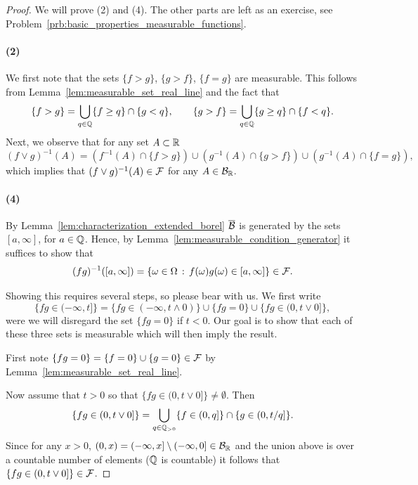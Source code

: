 \begin{proof}
We will prove (2) and (4). The other parts are left as an exercise, see Problem~\ref{prb:basic_properties_measurable_functions}.

\paragraph{(2)} We first note that the sets $\{f > g\}$, $\{g > f\}$, $\{f=g\}$ are measurable. This follows from Lemma~\ref{lem:measurable_set_real_line} and the fact that
\[
	\{f > g\} = \bigcup_{q \in \mathbb Q} \{f \ge q\} \cap \{g < q\},\qquad \{g > f\} = \bigcup_{q \in \mathbb Q} \{g \ge q\} \cap \{f < q\}.
\]
Next, we observe that for any set $A \subset \mathbb R$
\[
	(f \vee g)^{-1}(A) = \left(f^{-1}(A) \cap \{f > g\}\right) \cup \left(g^{-1}(A) \cap \{g > f\}\right) \cup (g^{-1}(A) \cap \{f=g\}),
\]
which implies that $(f \vee g)^{-1}(A) \in \mathcal F$ for any $A \in \mathcal B_{\mathbb R}$.

\paragraph{(4)} By Lemma~\ref{lem:characterization_extended_borel} $\overline{\mathcal B}$ is generated by the sets $[a,\infty]$, for $a \in \mathbb Q$. Hence, by Lemma~\ref{lem:measurable_condition_generator} it suffices to show that 
\[
	(fg)^{-1}([a,\infty]) = \{\omega \in \Omega \, : \, f(\omega) g(\omega) \in [a, \infty]\} \in \mathcal F.
\]

Showing this requires several steps, so please bear with us. We first write
\[
	\{fg \in (-\infty, t]\} = \{fg \in (-\infty, t \wedge 0)\} \cup \{fg = 0\} \cup \{fg \in (0,t \vee 0]\},
\]
were we will disregard the set $\{fg = 0\}$ if $t < 0$. Our goal is to show that each of these three sets is measurable which will then imply the result.

First note $\{fg = 0\} = \{f = 0\} \cup \{g = 0\} \in \mathcal F$ by Lemma~\ref{lem:measurable_set_real_line}.

Now assume that $t > 0$ so that $\{fg \in (0,t \vee 0]\} \ne \emptyset$. Then
\[
	\{fg \in (0,t \vee 0]\} = \bigcup_{q \in \mathbb Q_{>0}} \{f \in (0,q]\} \cap \{g \in (0,t/q]\}.
\]
Since for any $x >0$, $(0,x) = (-\infty,x] \setminus (-\infty,0] \in \mathcal B_{\mathbb R}$ and the union above is over a countable number of elements ($\mathbb Q$ is countable) it follows that $\{fg \in (0,t \vee 0]\} \in \mathcal F$.


\end{proof}
